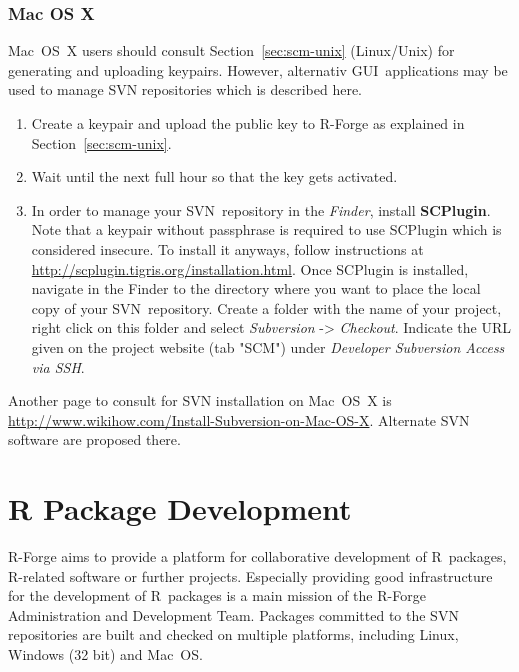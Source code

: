 \documentclass[a4paper]{article}
\newcommand{\RFORGE}{\proglang{R}-Forge Administration and Development Team}
\newcommand{\proglang}[1]{\textsf{#1}}
\begin{document}
\subsubsection{Mac OS X}
\label{sec:scm-macosx}
Mac~OS~X users should consult Section~\ref{sec:scm-unix} (Linux/Unix)
for generating and uploading keypairs. However, alternativ
GUI~applications may be used to manage SVN repositories which is
described here.

\begin{enumerate}
\item Create a keypair and upload the public key to \proglang{R}-Forge
  as explained in Section~\ref{sec:scm-unix}.

\item Wait until the next full hour so that the key gets activated.

\item In order to manage your SVN~repository in the \textit{Finder},
  install \textbf{SCPlugin}. Note that a keypair without passphrase is
  required to use SCPlugin which is considered insecure. To install it
  anyways, follow instructions at
  \url{http://scplugin.tigris.org/installation.html}. Once SCPlugin is
  installed, navigate in the Finder to the directory where you want to
  place the local copy of your SVN~repository. Create a folder with
  the name of your project, right click on this folder and select
  \textit{Subversion} -> \textit{Checkout}. Indicate the URL given on
  the project website (tab "SCM") under \textit{Developer Subversion
    Access via SSH}.

\end{enumerate}

Another page to consult for SVN installation on Mac~OS~X is
\url{http://www.wikihow.com/Install-Subversion-on-Mac-OS-X}. Alternate SVN
software are proposed there. 


\section{\proglang{R} Package Development}

\proglang{R}-Forge aims to provide a platform for collaborative development of
\proglang{R}~packages, \proglang{R}-related software or further
projects. Especially providing good infrastructure for the development of
\proglang{R}~packages is a main mission of the \RFORGE{}. Packages
committed to the SVN repositories are built and checked on multiple
platforms, including Linux, Windows (32 bit) and Mac~OS. 
\end{document}
